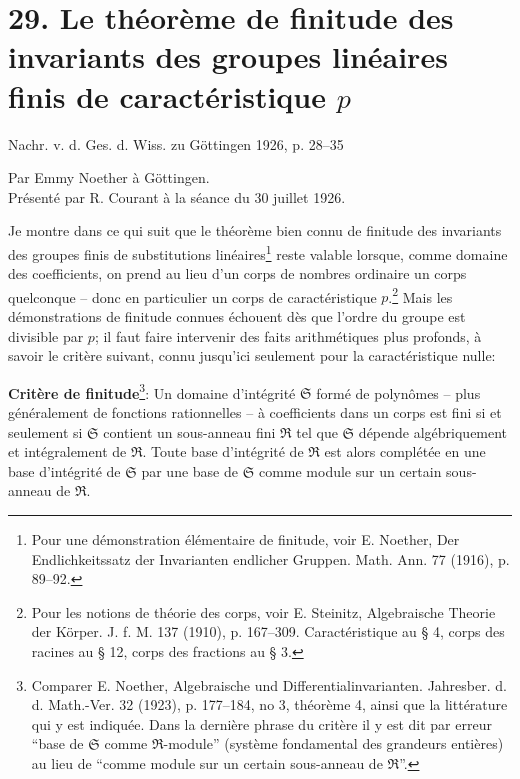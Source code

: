 \setcounter{footnote}{0}

\section*{29. Le théorème de finitude des invariants des groupes linéaires finis de caractéristique $p$}

\begin{center}
Nachr. v. d. Ges. d. Wiss. zu Göttingen 1926, p. 28--35
\end{center}

\begin{center}
Par Emmy Noether à Göttingen.\\[0.5em]
Présenté par R. Courant à la séance du 30 juillet 1926.
\end{center}

Je montre dans ce qui suit que le théorème bien connu de finitude des invariants des groupes finis de substitutions linéaires\footnote{Pour une démonstration élémentaire de finitude, voir E. Noether, Der Endlichkeitssatz der Invarianten endlicher Gruppen. Math. Ann. 77 (1916), p. 89--92.} reste valable lorsque, comme domaine des coefficients, on prend au lieu d'un corps de nombres ordinaire un corps quelconque -- donc en particulier un corps de caractéristique $p$.\footnote{Pour les notions de théorie des corps, voir E. Steinitz, Algebraische Theorie der Körper. J. f. M. 137 (1910), p. 167--309. Caractéristique au \S{} 4, corps des racines au \S{} 12, corps des fractions au \S{} 3.} Mais les démonstrations de finitude connues échouent dès que l'ordre du groupe est divisible par $p$; il faut faire intervenir des faits arithmétiques plus profonds, à savoir le critère suivant, connu jusqu'ici seulement pour la caractéristique nulle:

\textbf{Critère de finitude}\footnote{Comparer E. Noether, Algebraische und Differentialinvarianten. Jahresber. d. d. Math.-Ver. 32 (1923), p. 177--184, no 3, théorème 4, ainsi que la littérature qui y est indiquée. Dans la dernière phrase du critère il y est dit par erreur ``base de $\mathfrak S$ comme $\mathfrak R$-module'' (système fondamental des grandeurs entières) au lieu de ``comme module sur un certain sous-anneau de $\mathfrak R$''.}: Un domaine d’intégrité $\mathfrak S$ formé de polynômes -- plus généralement de fonctions rationnelles -- à coefficients dans un corps est fini si et seulement si $\mathfrak S$ contient un sous-anneau fini $\mathfrak R$ tel que $\mathfrak S$ dépende algébriquement et intégralement de $\mathfrak R$. Toute base d'intégrité de $\mathfrak R$ est alors complétée en une base d'intégrité de $\mathfrak S$ par une base de $\mathfrak S$ comme module sur un certain sous-anneau de $\mathfrak R$.


